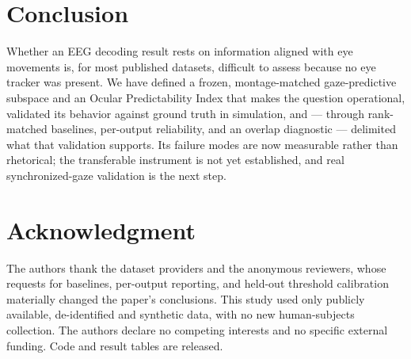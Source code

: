 \documentclass[conference]{IEEEtran}
\begin{document}
\section{Conclusion}

Whether an EEG decoding result rests on information aligned with eye movements is, for most
published datasets, difficult to assess because no eye tracker was present. We have defined a frozen,
montage-matched gaze-predictive subspace and an Ocular Predictability Index that makes the
question operational, validated its behavior against ground truth in simulation, and --- through
rank-matched baselines, per-output reliability, and an overlap diagnostic --- delimited what that
validation supports. Its failure modes are now measurable rather than rhetorical; the transferable
instrument is not yet established, and real synchronized-gaze validation is the next step.

\section*{Acknowledgment}

The authors thank the dataset providers and the anonymous reviewers, whose requests for
baselines, per-output reporting, and held-out threshold calibration materially changed the
paper's conclusions. This study used only publicly available, de-identified and synthetic data,
with no new human-subjects collection. The authors declare no competing interests and no specific
external funding. Code and result tables are released.
\end{document}
